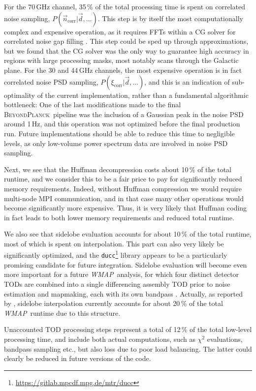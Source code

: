 \documentclass[twocolumn]{aa}
\def\WMAP{\emph{WMAP}}
\renewcommand{\d}[0]{\vec{d}}
\newcommand{\n}[0]{\vec{n}}
\newcommand{\BP}{\textsc{BeyondPlanck}}
\begin{document}
For the 70\,GHz channel, 35\,\% of the total processing time is spent
on correlated noise sampling, $P(\n_{\mathrm{corr}}|\d,\ldots)$. This
step is by itself the most computationally complex and expensive
operation, as it requires FFTs within a CG solver for correlated noise
gap filling \citep{BP06}. This step could be sped up through
approximations, but we found that the CG solver was the only way to
guarantee high accuracy in regions with large processing masks, most
notably scans through the Galactic plane. For the 30 and 44\,GHz
channels, the most expensive operation is in fact correlated noise PSD
sampling, $P(\xi_{\mathrm{corr}}|\d,\ldots)$, and this is an
indication of sub-optimality of the current implementation, rather
than a fundamental algorithmic bottleneck: One of the last
modifications made to the final \BP\ pipeline was the inclusion of a
Gaussian peak in the noise PSD around 1\,Hz, and this operation was
not optimized before the final production run. Future implementations
should be able to reduce this time to negligible levels, as only
low-volume power spectrum data are involved in noise PSD sampling.

Next, we see that the Huffman decompression costs about 10\,\% of the
total runtime, and we consider this to be a fair price to pay for
significantly reduced memory requirements. Indeed, without Huffman
compression we would require multi-node MPI communication, and in that
case many other operations would become significantly more
expensive. Thus, it is very likely that Huffman coding in fact leads
to both lower memory requirements and reduced total runtime.

We also see that sidelobe evaluation accounts for about 10\,\% of the
total runtime, most of which is spent on interpolation. This part can
also very likely be significantly optimized, and the
\texttt{ducc}\footnote{\url{https://gitlab.mpcdf.mpg.de/mtr/ducc}}
library appears to be a particularly promising candidate for future
integration. Sidelobe evaluation will become even more important for a
future \WMAP\ analysis, for which four distinct detector TODs are
combined into a single differencing assembly TOD prior to noise
estimation and mapmaking, each with its own bandpass
\citep{bennett2012}. Actually, as reported by \citet{BP17}, sidelobe
interpolation currently accounts for about 20\,\% of the total
\WMAP\ runtime due to this structure.

Unaccounted TOD processing steps represent a total of 12\,\% of the
total low-level processing time, and include both actual computations,
such as $\chi^2$ evaluations, bandpass sampling etc., but also loss
due to poor load balancing. The latter could clearly be reduced in
future versions of the code.
\end{document}
